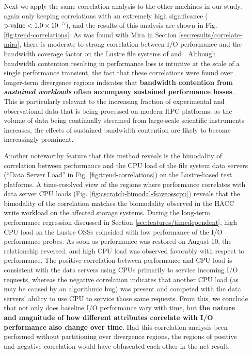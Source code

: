Next we apply the same correlation analysis to the other machines in our study, again only keeping correlations with an extremely high significance ($\textup{p-value} < {1.0 \times 10^{-5}}$), and the results of this analysis are shown in Fig. \ref{fig:trend-correlations}.
As was found with Mira in Section \ref{sec:results/correlate-mira}, there is moderate to strong correlation between I/O performance and the bandwidth coverage factor on the Lustre file systems of \cori and \edison.
Although bandwidth contention resulting in performance loss is intuitive at the scale of a single performance transient, the fact that these correlations were found over longer-term divergence regions indicates that \textbf{bandwidth contention from \emph{sustained workloads} often accompany sustained performance losses}.
This is particularly relevant to the increasing fraction of experimental and observational data that is being processed on modern HPC platforms; as the volume of data being continually streamed from large-scale scientific instruments increases, the effects of sustained bandwidth contention are likely to become increasingly prominent.


Another noteworthy feature that this method reveals is the bimodality of correlation between performance and the CPU load of the file system data servers (``Data Server Load'' in Fig. \ref{fig:trend-correlations}) on the Lustre-based test platforms.
A time-resolved view of the regions where performance correlates with data server CPU loads (Fig. \ref{fig:cscratch-bimodal-fsaveosscpu}) reveals that the bimodality of the correlation matches the biomodality observed in the HACC write workload on the affected storage systems.
During the long-term performance regression discussed in Section \ref{sec:features/timedependent}, high CPU load on the Lustre OSSs coincided with low performance of the I/O performance probes.
As soon as performance was restored on August 10, the relationship reversed, and high CPU load was observed favorably with respect to performance.
The positive correlation between performance and CPU load is consistent with the data servers using CPUs primarily to service incoming I/O requests, whereas the negative correlation indicates that another CPU load (as may be caused by an algorithmic bug) was present and competed with the data servers' ability to use CPU to service those same requests.
From this, we conclude that not only does baseline I/O performance vary with time, but \textbf{the nature and magnitude of how different attributes correlate with I/O performance also change over time}.
Had this correlation analysis been performed without partitioning over divergence regions, the regions of positive and negative correlation would have obfuscated each other in the net result.

